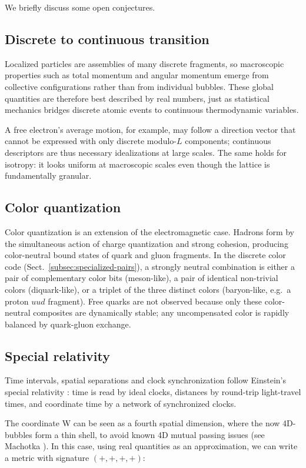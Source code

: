 \documentclass{ijuc}
\begin{document}
We briefly discuss some open conjectures.

\subsection{Discrete to continuous transition}

Localized particles are assemblies of many discrete fragments, so macroscopic properties such as total momentum and angular momentum emerge from collective configurations rather than from individual bubbles. These global quantities are therefore best described by real numbers, just as statistical mechanics bridges discrete atomic events to continuous thermodynamic variables.

A free electron's average motion, for example, may follow a direction vector that cannot be expressed with only discrete modulo-$L$ components; continuous descriptors are thus necessary idealizations at large scales. The same holds for isotropy: it looks uniform at macroscopic scales even though the lattice is fundamentally granular.

\subsection{Color quantization}
Color quantization is an extension of the electromagnetic case. 
Hadrons form by the simultaneous action of charge quantization and strong cohesion, producing color-neutral bound states of quark and gluon fragments. In the discrete color code (Sect.~\ref{subsec:specialized-pairs}), a strongly neutral combination is either a pair of complementary color bits (meson-like), a pair of identical non-trivial colors (diquark-like), or a triplet of the three distinct colors (baryon-like, e.g.\ a proton $uud$ fragment). Free quarks are not observed because only these color-neutral composites are dynamically stable; any uncompensated color is rapidly balanced by quark-gluon exchange.

\subsection{Special relativity}
Time intervals, spatial separations and clock synchronization follow Einstein's special relativity \cite{Einstein1905}: time is read by ideal clocks, distances by round-trip light-travel times, and coordinate time by a network of synchronized clocks.

The coordinate W can be seen as a fourth spatial dimension, where the now 4D-bubbles form a thin shell, to avoid known 4D mutual passing issues  (see Machotka \cite{Machotka2025}). In this case, using real quantities as an approximation, we can write a metric with signature $(+,+,+,+)$:
\end{document}
